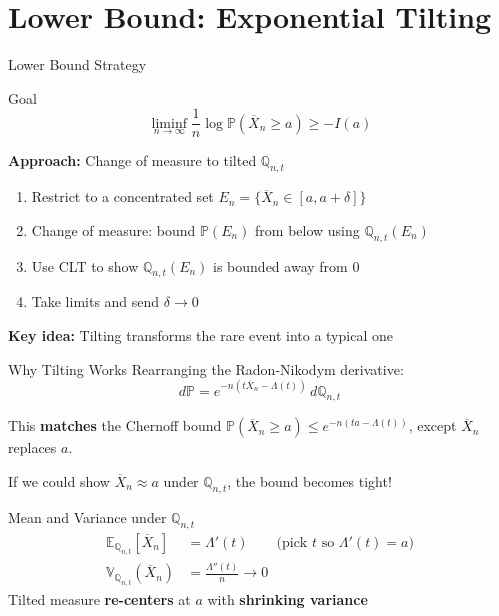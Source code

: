 \documentclass[aspectratio=169]{beamer}
\newcommand{\E}{\mathbb{E}}
\renewcommand{\P}{\mathbb{P}}
\newcommand{\Q}{\mathbb{Q}}
\newcommand{\Var}{\mathbb{V}}
\begin{document}
\section{Lower Bound: Exponential Tilting}

\begin{frame}{Lower Bound Strategy}
  \begin{block}{Goal}
    \[
      \liminf_{n \to \infty} \frac{1}{n}\log\P(\overline{X}_n \ge a) \ge -I(a)
    \]
  \end{block}
  \vspace{0.3cm}
  \textbf{Approach:} Change of measure to tilted $\Q_{n,t}$
  \begin{enumerate}
    \item Restrict to a concentrated set $E_n = \{\overline{X}_n \in [a, a+\delta]\}$
    \item Change of measure: bound $\P(E_n)$ from below using $\Q_{n,t}(E_n)$
    \item Use CLT to show $\Q_{n,t}(E_n)$ is bounded away from 0
    \item Take limits and send $\delta \to 0$
  \end{enumerate}
  \vspace{0.2cm}
  \begin{center}
    \textbf{Key idea:} Tilting transforms the rare event into a typical one
  \end{center}
\end{frame}

\begin{frame}{Why Tilting Works}
  Rearranging the Radon-Nikodym derivative:
  \[
    d\P = e^{-n(t\overline{X}_n - \Lambda(t))}\,d\Q_{n,t}
  \]

  This \textbf{matches} the Chernoff bound $\P(\overline{X}_n \ge a) \le e^{-n(ta - \Lambda(t))}$,
  except $\overline{X}_n$ replaces $a$.

  \vspace{0.3cm}
  If we could show $\overline{X}_n \approx a$ under $\Q_{n,t}$, the bound becomes tight!

  \vspace{0.3cm}
  \begin{block}{Mean and Variance under $\Q_{n,t}$}
    \begin{align*}
      \E_{\Q_{n,t}}[\overline{X}_n] &= \Lambda'(t) \quad\quad \text{(pick $t$ so $\Lambda'(t) = a$)} \\
      \Var_{\Q_{n,t}}(\overline{X}_n) &= \frac{\Lambda''(t)}{n} \to 0
    \end{align*}
    Tilted measure \textbf{re-centers} at $a$ with \textbf{shrinking variance}
  \end{block}
\end{frame}
\end{document}
